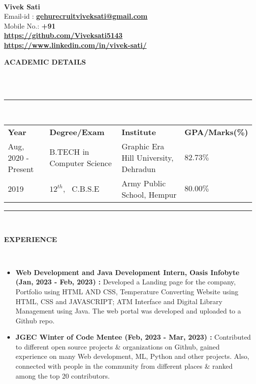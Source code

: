 \documentclass[a4paper,10pt]{article}
\newcommand{\lsep}{-0.5cm}
\newcommand{\resheading}[1]{{\small \colorbox{mygrey}{\begin{minipage}{0.975\textwidth}{\textbf{#1 \vphantom{p\^{E}}}}\end{minipage}}}}
\begin{document}
\hspace{0.5cm}\\[-0.2cm]

\textbf{Vivek Sati} \\
\indent Email-id : \textbf{\url{gehurecruitviveksati@gmail.com}} \\
\indent Mobile No.: \textbf{+91 } \ \\
\indent \textbf{\url{https://github.com/Viveksati5143}}\\
\indent \textbf{\url{https://www.linkedin.com/in/vivek-sati/}}\\

\resheading{\textbf{ACADEMIC DETAILS} }\\[\lsep]
\\
\indent \rule{6.8in}{0.4pt}\\
\indent \begin{tabular}{ l @{\hskip 0.15in} l @{\hskip 0.15in} l @{\hskip 0.15in} l @{\hskip 0.15in} }
\noindent \textbf{Year} & \textbf{Degree/Exam} & \textbf{Institute} & \textbf{GPA/Marks(\%)} \\
Aug, 2020 - Present & B.TECH in Computer Science & Graphic Era Hill University, Dehradun & $82.73 \%$ \\
2019 & $12^{th}$, \ C.B.S.E & Army Public School, Hempur & $80.00 \%$ \\

\end{tabular}
\indent \rule{6.8in}{0.4pt}
\\

\resheading{\textbf{EXPERIENCE} }\\[\lsep]
\begin{itemize}
\setlength\itemsep{0.5em}
\item \textbf{Web Development and Java Development Intern, Oasis Infobyte (Jan, 2023 - Feb, 2023) : }Developed
a Landing page for the company, Portfolio using HTML AND CSS, Temperature Converting Website using HTML, CSS and JAVASCRIPT; ATM Interface and Digital Library Management using Java.
The web portal was developed and uploaded to a Github repo.
\item \textbf{JGEC Winter of Code Mentee (Feb, 2023 - Mar, 2023) : }Contributed to different open source projects \& organizations on Github, gained experience on many Web development, ML, Python and other projects. Also, connected with people in the community from different places \& ranked among the top 20 contributors.
\end{itemize}
\end{document}
